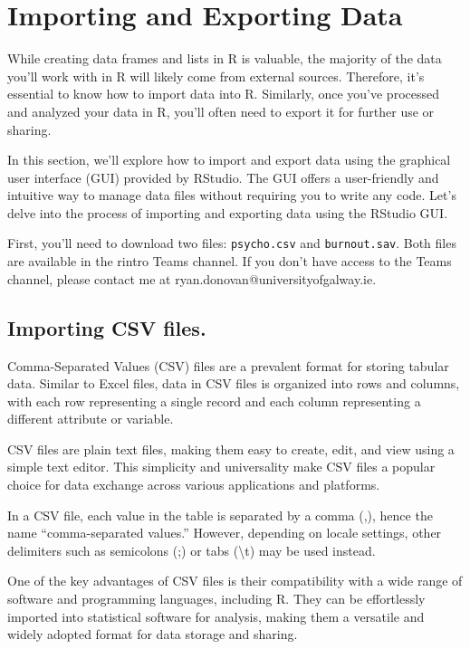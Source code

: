 \documentclass[
]{book}
\begin{document}
\hypertarget{importing-and-exporting-data}{%
\section{Importing and Exporting Data}\label{importing-and-exporting-data}}

While creating data frames and lists in R is valuable, the majority of the data you'll work with in R will likely come from external sources. Therefore, it's essential to know how to import data into R. Similarly, once you've processed and analyzed your data in R, you'll often need to export it for further use or sharing.

In this section, we'll explore how to import and export data using the graphical user interface (GUI) provided by RStudio. The GUI offers a user-friendly and intuitive way to manage data files without requiring you to write any code. Let's delve into the process of importing and exporting data using the RStudio GUI.

First, you'll need to download two files: \texttt{psycho.csv} and \texttt{burnout.sav}. Both files are available in the rintro Teams channel. If you don't have access to the Teams channel, please contact me at ryan.donovan@universityofgalway.ie.

\hypertarget{importing-csv-files.}{%
\subsection{Importing CSV files.}\label{importing-csv-files.}}

Comma-Separated Values (CSV) files are a prevalent format for storing tabular data. Similar to Excel files, data in CSV files is organized into rows and columns, with each row representing a single record and each column representing a different attribute or variable.

CSV files are plain text files, making them easy to create, edit, and view using a simple text editor. This simplicity and universality make CSV files a popular choice for data exchange across various applications and platforms.

In a CSV file, each value in the table is separated by a comma (,), hence the name ``comma-separated values.'' However, depending on locale settings, other delimiters such as semicolons (;) or tabs (\textbackslash t) may be used instead.

One of the key advantages of CSV files is their compatibility with a wide range of software and programming languages, including R. They can be effortlessly imported into statistical software for analysis, making them a versatile and widely adopted format for data storage and sharing.
\end{document}
